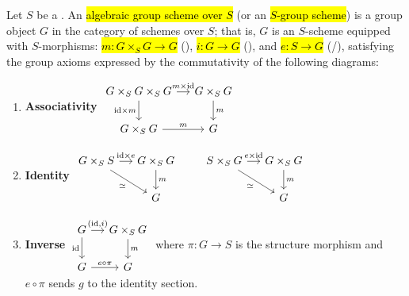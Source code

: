\begin{definition} \label{definition:algebraic_group_scheme_over_a_scheme}
Let $S$ be a . 
An \hl{algebraic group scheme over $S$} (or an \hl{$S$-group scheme}) is a group object $G$ in the category of schemes over $S$; that is, $G$ is an $S$-scheme equipped with $S$-morphisms:
\hl{$m: G \times_S G \to G$} (), \hl{$i: G \to G$} (), and \hl{$e: S \to G$} (/),
satisfying the group axioms expressed by the commutativity of the following diagrams:

\begin{enumerate}
    \item \textbf{Associativity}\quad
    $
    \begin{tikzcd}[column sep=small]
      G \times_S G \times_S G \arrow{r}{m \times \mathrm{id}} \arrow{d}[swap]{\mathrm{id} \times m} & G \times_S G \arrow{d}{m} \\
      G \times_S G \arrow{r}{m} & G
    \end{tikzcd}
    $
    \item \textbf{Identity}\quad
    $
    \begin{tikzcd}[column sep=small]
      G \times_S S \arrow{r}{\mathrm{id} \times e} \arrow{dr}[swap]{\simeq} & G \times_S G \arrow{d}{m} \\
      & G
    \end{tikzcd}
    \qquad
    \begin{tikzcd}[column sep=small]
      S \times_S G \arrow{r}{e \times \mathrm{id}} \arrow{dr}[swap]{\simeq} & G \times_S G \arrow{d}{m} \\
      & G
    \end{tikzcd}
    $
    \item \textbf{Inverse}\quad
    $
    \begin{tikzcd}[column sep=small]
      G \arrow{r}{(\mathrm{id}, i)} \arrow{d}[swap]{\mathrm{id}} & G \times_S G \arrow{d}{m} \\
      G \arrow{r}{e \circ \pi} & G
    \end{tikzcd}
    $
    where $\pi: G \to S$ is the structure morphism and $e \circ \pi$ sends $g$ to the identity section.
\end{enumerate}



\end{definition}
